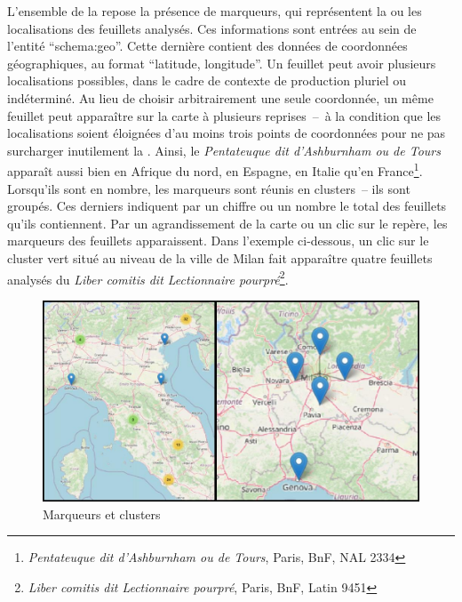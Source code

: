 L’ensemble de la  repose la présence de marqueurs, qui représentent la ou les localisations des feuillets analysés. Ces informations sont entrées au sein de l’entité \enquote{schema:geo}. Cette dernière contient des données de coordonnées géographiques, au format \enquote{latitude, longitude}. Un feuillet peut avoir plusieurs localisations possibles, dans le cadre de contexte de production pluriel ou indéterminé. Au lieu de choisir arbitrairement une seule coordonnée, un même feuillet peut apparaître sur la carte à plusieurs reprises~–~à la condition que les localisations soient éloignées d’au moins trois points de coordonnées pour ne pas surcharger inutilement la . Ainsi, le \textit{Pentateuque dit d’Ashburnham ou de Tours} apparaît aussi bien en Afrique du nord, en Espagne, en Italie qu’en France\footnote{\textit{Pentateuque dit d’Ashburnham ou de Tours}, Paris, BnF, NAL 2334}. Lorsqu’ils sont en nombre, les marqueurs sont réunis en clusters – ils sont groupés. Ces derniers indiquent par un chiffre ou un nombre le total des feuillets qu’ils contiennent. Par un agrandissement de la carte ou un clic sur le repère, les marqueurs des feuillets apparaissent. Dans l’exemple ci-dessous, un clic sur le cluster vert situé au niveau de la ville de Milan fait apparaître quatre feuillets analysés du \textit{Liber comitis dit Lectionnaire pourpré}\footnote{\textit{Liber comitis dit Lectionnaire pourpré}, Paris, BnF, Latin 9451}.\par

\begin{figure}[H]
	\centering
	\includegraphics[scale=0.3]{./textes/chap2/localisation.jpg}
	\caption{Marqueurs et clusters}
	\label{fig:info}
\end{figure}

